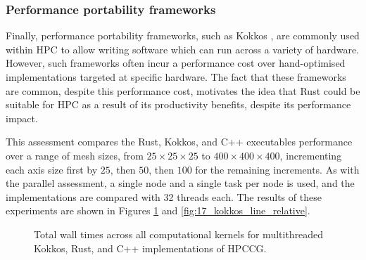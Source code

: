 %     

%     


\subsubsection{Performance portability frameworks}
\label{sssec:performance-portability-frameworks-results}

Finally, performance portability frameworks, such as Kokkos \cite{KokkosEcosystem}, are commonly used within \acrshort{HPC} to allow writing software which can run across a variety of hardware. However, such frameworks often incur a performance cost over hand-optimised implementations targeted at specific hardware. The fact that these frameworks are common, despite this performance cost, motivates the idea that Rust could be suitable for \acrshort{HPC} as a result of its productivity benefits, despite its performance impact.

This assessment compares the Rust, Kokkos, and C++ executables performance over a range of mesh sizes, from $25 \times 25 \times 25$ to $400 \times 400 \times 400$, incrementing each axis size first by $25$, then $50$, then $100$ for the remaining increments. As with the parallel assessment, a single node and a single task per node is used, and the implementations are compared with 32 threads each. The results of these experiments are shown in Figures \ref{fig:16_kokkos_line} and \ref{fig:17_kokkos_line_relative}.

\begin{figure}[H]
    \centering
    
    \vspace*{-0.5cm}
    \caption{Total wall times across all computational kernels for multithreaded Kokkos, Rust, and C++ implementations of HPCCG.}
    \label{fig:16_kokkos_line}
\end{figure}

